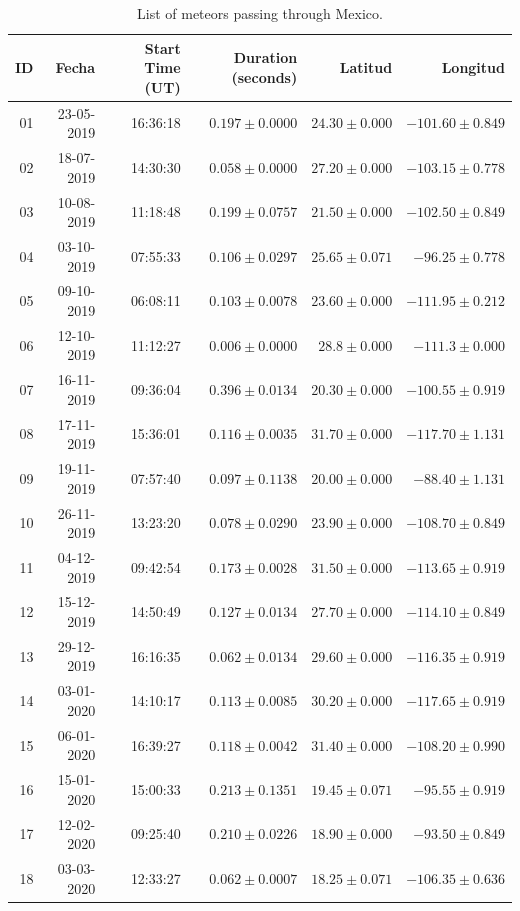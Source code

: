\documentclass[times,twocolumn,final,authoryear]{elsarticle}
\begin{document}
\begin{table}
\centering
\caption{List of meteors passing through Mexico.}
\label{tab:table-meteors}
\begin{tabular}{|r|r|r|r|r|r|}
\hline
ID & Fecha & Start Time (UT)  & Duration (seconds) & Latitud & Longitud \\
\hline
01 & 23-05-2019 & 16:36:18 & $0.197\pm 0.0000$ & $24.30 \pm 0.000$ & $-101.60 \pm 0.849$\\
02 & 18-07-2019 & 14:30:30 & $0.058\pm 0.0000$ & $27.20 \pm 0.000$ & $-103.15 \pm 0.778$\\
03 & 10-08-2019 & 11:18:48 & $0.199\pm 0.0757$ & $21.50 \pm 0.000$ & $-102.50  \pm 0.849$\\
04 & 03-10-2019 & 07:55:33 & $0.106\pm 0.0297$ & $25.65 \pm 0.071$ & $-96.25 \pm   0.778$\\
05 & 09-10-2019 & 06:08:11 & $0.103\pm 0.0078$ & $23.60 \pm 0.000$ & $-111.95 \pm  0.212$\\
06 & 12-10-2019 & 11:12:27 & $0.006\pm 0.0000$ & $28.8 \pm 0.000$ & $-111.3 \pm 0.000$\\
07 & 16-11-2019 & 09:36:04 & $0.396\pm 0.0134$ & $20.30 \pm 0.000$ & $-100.55 \pm  0.919$\\
08 & 17-11-2019 & 15:36:01 & $0.116\pm 0.0035$ & $31.70 \pm 0.000$ & $-117.70 \pm  1.131$\\
09 & 19-11-2019 & 07:57:40 & $0.097\pm 0.1138$ & $20.00 \pm 0.000$ & $-88.40 \pm  1.131$\\
10 & 26-11-2019 & 13:23:20 & $0.078\pm 0.0290$ & $23.90 \pm 0.000$ & $-108.70 \pm  0.849$\\
11 & 04-12-2019 & 09:42:54 & $0.173\pm 0.0028$ & $31.50 \pm 0.000$ & $-113.65 \pm  0.919$\\
12 & 15-12-2019 & 14:50:49 & $0.127\pm 0.0134$ & $27.70 \pm 0.000$ & $-114.10 \pm  0.849$\\
13 & 29-12-2019 & 16:16:35 & $0.062\pm 0.0134$ & $29.60 \pm 0.000$ & $-116.35 \pm  0.919$\\
14 & 03-01-2020 & 14:10:17 & $0.113\pm 0.0085$ & $30.20 \pm 0.000$ & $-117.65 \pm  0.919$\\
15 & 06-01-2020 & 16:39:27 & $0.118\pm 0.0042$ & $31.40 \pm 0.000$ & $-108.20 \pm  0.990$\\
16 & 15-01-2020 & 15:00:33 & $0.213\pm 0.1351$ & $19.45 \pm 0.071$ & $-95.55 \pm   0.919$\\
17 & 12-02-2020 & 09:25:40 & $0.210\pm 0.0226$ & $18.90 \pm 0.000$ & $-93.50 \pm   0.849$\\
18 & 03-03-2020 & 12:33:27 & $0.062\pm 0.0007$ & $18.25 \pm 0.071$ & $-106.35 \pm 0.636$\\

\end{tabular}
\end{table}
\end{document}
